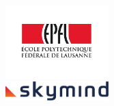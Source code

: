 \begin{titlepage}
\begin{minipage}[t]{0.4\textwidth}
\begin{flushright}
				
		\end{flushright} 
	\end{minipage}\\
	[3cm]
	\begin{figure}[h]
		\begin{minipage}[t]{0.4\textwidth}
			\begin{flushleft}
				\includegraphics[width=4cm]{images/epfl.pdf}
			\end{flushleft}
			
		\end{minipage}
		\hfill
		\begin{minipage}[t]{0.4\textwidth}
			\begin{flushright}
				\includegraphics[width=4cm]{images/skymind.png}
			\end{flushright}
		\end{minipage}
	\end{figure}
		
	
\end{titlepage}

